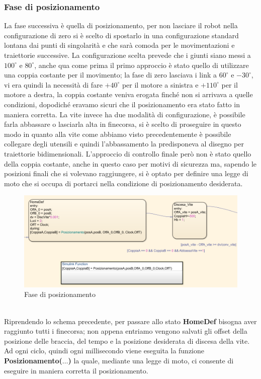 \subsubsection{Fase di posizionamento}
La fase successiva è quella di posizionamento, per non lasciare il robot nella configurazione di zero si è scelto di spostarlo in una configurazione standard lontana dai punti di singolarità e che sarà comoda per le movimentazioni e traiettorie successive. La configurazione scelta prevede che i giunti siano messi a $100^\circ$ e $80^\circ$, anche qua come prima il primo approccio è stato quello di utilizzare una coppia costante per il movimento; la fase di zero lasciava i link a $60^\circ$ e $-30^\circ$, vi era quindi la necessità di fare $+40^\circ$ per il motore a sinistra e $+110^\circ$ per il motore a destra, la coppia costante veniva erogata finché non si arrivava a quelle condizioni, dopodiché eravamo sicuri che il posizionamento era stato fatto in maniera corretta. La vite invece ha due modalità di configurazione, è possibile farla abbassare o lasciarla alta in finecorsa, si è scelto di proseguire in questo modo in quanto alla vite come abbiamo visto precedentemente è possibile collegare degli utensili e quindi l'abbassamento la predisponeva al disegno per traiettorie bidimensionali. L'approccio di controllo finale però non è stato quello della coppia costante, anche in questo caso per motivi di sicurezza ma, sapendo le posizioni finali che si volevano raggiungere, si è optato per definire una legge di moto che si occupa di portarci nella condizione di posizionamento desiderata.
\begin{figure}[ht]
\begin{center}
    \includegraphics[scale=0.58]{Immagini/Sperimentale/state2New.png}
    \caption{Fase di posizionamento}
    \label{fig:Pos}
\end{center}
\end{figure}
\\Riprendendo lo schema precedente, per passare allo stato \textbf{HomeDef} bisogna aver raggiunto tutti i finecorsa; non appena entriamo vengono salvati gli offset della posizione delle braccia, del tempo e la posizione desiderata di discesa della vite. Ad ogni ciclo, quindi ogni millisecondo viene eseguita la funzione \textbf{Posizionamento($\dots$)} la quale, mediante una legge di moto, ci consente di eseguire in maniera corretta il posizionamento.

